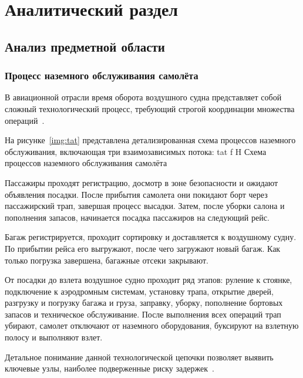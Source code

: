 \chapter{Аналитический раздел}


\section{Анализ предметной области}

\subsection{Процесс наземного обслуживания самолёта}

В авиационной отрасли время оборота воздушного судна представляет собой сложный технологический процесс, требующий строгой координации множества операций~\cite{otplane}.

На рисунке~\ref{img:tat} представлена детализированная схема процессов наземного обслуживания, включающая три взаимозависимых потока:
    {tat}
    {f}
    {H}
    {\textwidth}
    {Схема процессов наземного обслуживания самолёта}

Пассажиры проходят регистрацию, досмотр в зоне безопасности и ожидают объявления посадки.
После прибытия самолета они покидают борт через пассажирский трап, завершая процесс высадки.
Затем, после уборки салона и пополнения запасов, начинается посадка пассажиров на следующий рейс.

Багаж регистрируется, проходит сортировку и доставляется к воздушному судну.
По прибытии рейса его выгружают, после чего загружают новый багаж.
Как только погрузка завершена, багажные отсеки закрывают.

От посадки до взлета воздушное судно проходит ряд этапов: руление к стоянке, подключение к аэродромным системам, установку трапа, открытие дверей, разгрузку и погрузку багажа и груза, заправку, уборку, пополнение бортовых запасов и техническое обслуживание.
После выполнения всех операций трап убирают, самолет отключают от наземного оборудования, буксируют на взлетную полосу и выполняют взлет.

Детальное понимание данной технологической цепочки позволяет выявить ключевые узлы, наиболее подверженные риску задержек~\cite{trt-timeestimation}.

